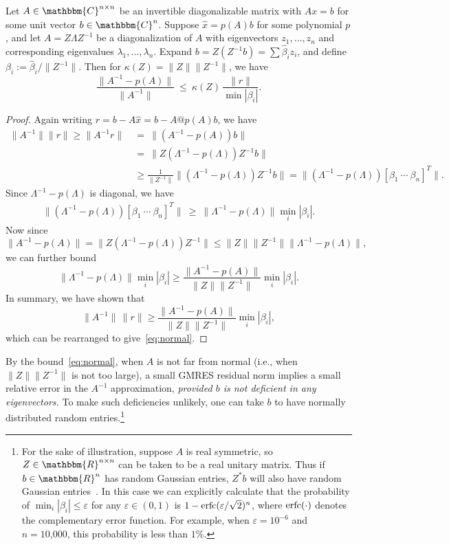 \documentclass{siamart}
\def\C{\mathbbm{C}}
\def\R{\mathbbm{R}}
\def\Cn{\C^n}
\def\Cnn{\C^{n\times n}}
\def\wh#1{\widehat{#1}}
\begin{document}
\begin{theorem} \label{thm:normal}
Let $A\in\Cnn$ be an invertible diagonalizable matrix with $Ax=b$ for some unit vector $b\in\Cn$.
Suppose $\wh{x} = p(A) b$ for some polynomial $p$,
and let $A = Z\Lambda Z^{-1}$ be a diagonalization of $A$ with eigenvectors $z_1, \ldots, z_n$ and corresponding eigenvalues $\lambda_1, \ldots, \lambda_n$.  
Expand $b = Z(Z^{-1}b) = \sum \widehat{\beta}_i z_i$, and define $\beta_i := \widehat{\beta}_i/\|Z^{-1}\|$.  Then for $\kappa(Z) = \|Z\| \|Z^{-1}\|$, we have
\begin{equation} \label{eq:normal}
    \frac{\|A^{-1}-p(A)\|}{\|A^{-1}\|}\ \leq\ \kappa(Z)\, \frac{\|r\|}{\min|\beta_i|}.
\end{equation}
\end{theorem}
\begin{proof}
Again writing $r = b - A \wh{x} = b - A@p(A)b$, we have
\begin{align*}
    \|A^{-1}\|\|r\|  \geq \|A^{-1}r\| &\ =\ \|(A^{-1}-p(A))b\| \\
    & \ =\  \|Z(\Lambda^{-1} - p(\Lambda)) Z^{-1} b \| \\
    & \ \ge \frac{1}{\|Z^{-1}\|} \|(\Lambda^{-1} - p(\Lambda)) Z^{-1}b \|
    =
    \|(\Lambda^{-1} - p(\Lambda)) [\beta_1\ \cdots\  \beta_n]^T \|.
\end{align*}
Since $\Lambda^{-1}-p(\Lambda)$ is diagonal, we have 
\begin{align*}
 \|(\Lambda^{-1} - p(\Lambda)) [\beta_1\ \cdots\  \beta_n]^T \| \ \ge\  
    \|\Lambda^{-1} - p(\Lambda)\| \min_i |\beta_i|.
\end{align*}
Now since
\[ \|A^{-1} - p(A)\| = \|Z(\Lambda^{-1} - p(\Lambda)) Z^{-1}\| \le \|Z\| \|Z^{-1}\| \|\Lambda^{-1} - p(\Lambda)\|,\]
we can further bound
\[\|\Lambda^{-1} - p(\Lambda)\| \min_i |\beta_i|
    \ge \frac{\|A^{-1} - p(A)\|}{\|Z\| \|Z^{-1}\|} \min_i |\beta_i|.
\]
In summary, we have shown that
\[ \|A^{-1}\|\,\|r\| \ge \frac{\|A^{-1} - p(A)\|}{\|Z\| \|Z^{-1}\|} \min_i |\beta_i|,\]
which can be rearranged to give~\cref{eq:normal}.
\end{proof}

By the bound~\cref{eq:normal}, when $A$ is not far from normal (i.e., when $\|Z\| \|Z^{-1}\|$ is not too large), a small GMRES residual norm implies a small relative error in the $A^{-1}$ approximation, \emph{provided $b$ is not deficient in any eigenvectors.}  To make such deficiencies unlikely, one can take $b$ to have normally distributed random entries.\footnote{For the sake of illustration, suppose $A$ is real symmetric, so $Z\in\R^{n\times n}$ can be taken to be a real unitary matrix.  Thus if $b\in\R^n$ has random Gaussian entries, $Z^*b$ will also have random Gaussian entries~\cite[thm.~1.2.6]{Mui82}.  In this case we can explicitly calculate that the probability of $\min_i |\beta_i| \le \varepsilon$ for any $\varepsilon \in (0,1)$ is $1 - {\rm erfc}(\varepsilon/\sqrt{2})^n$, where ${\rm erfc}(\cdot)$ denotes the complementary error function.  For example, when $\varepsilon=10^{-6}$ and $n=\mbox{10,000}$, this probability is less than $1\%$.}
\end{document}
